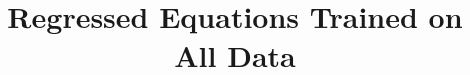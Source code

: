 \documentclass[journal]{IEEEtran}
\begin{document}
\title{Regressed Equations Trained on All Data}



\newcommand{\EQN}[0]{Eq. }
\newcommand{\FIG}[0]{Fig. }
\newcommand{\SEC}[0]{Sec. }
\newcommand{\TAB}[0]{Table }
\newcommand{\APX}[0]{Appendix }
\newcommand{\note}[1]{{\bf[#1]}}
\newcommand{\specialcell}[2][c]{%
  \begin{tabular}[#1]{@{}c@{}}#2\end{tabular}}
\newcommand{\tablefont}[1]{\fontsize{#1}{#1}\selectfont}
\newcommand{\UL}[0]{$\rm \mu L$}
\newcommand{\UM}[0]{$\rm \mu m$}




\maketitle







\end{document}

